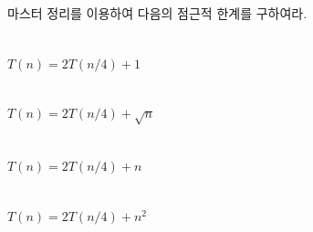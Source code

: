 \documentclass{oblivoir}
\begin{document}
    

마스터 정리를 이용하여 다음의 점근적 한계를 구하여라.

\section{}

$T(n) = 2T(n/4) + 1$

\section{}

$T(n) = 2T(n/4) + \sqrt{n}$
\section{}

$T(n) = 2T(n/4) + n$

\section{}

$T(n) = 2T(n/4) + n^2$
\end{document}
